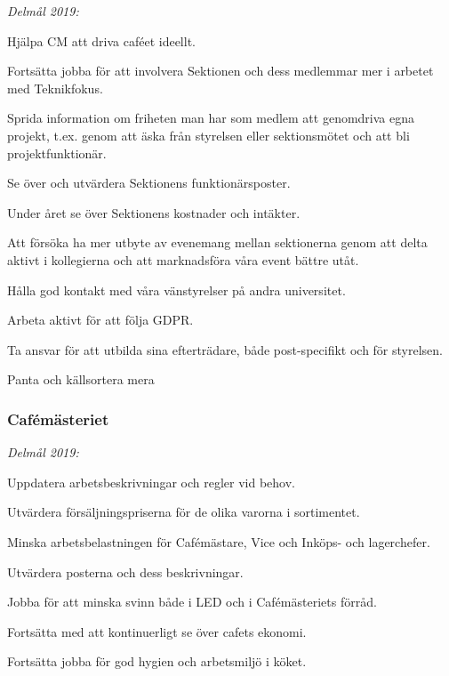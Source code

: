 \documentclass[10pt]{article}
\begin{document}
    \emph{Delmål 2019:}
    \begin{dashlist}
        \item Hjälpa CM att driva caféet ideellt. 
        \item Fortsätta jobba för att involvera Sektionen och dess medlemmar mer i arbetet med Teknikfokus. 
        \item Sprida information om friheten man har som medlem att genomdriva egna projekt, t.ex. genom att äska från styrelsen eller sektionsmötet och att bli projektfunktionär. 
        \item Se över och utvärdera Sektionens funktionärsposter. 
        \item Under året se över Sektionens kostnader och intäkter. 
        \item Att försöka ha mer utbyte av evenemang mellan sektionerna genom att delta aktivt i kollegierna och att marknadsföra våra event bättre utåt. 
        \item Hålla god kontakt med våra vänstyrelser på andra universitet.
        \item Arbeta aktivt för att följa GDPR.
        \item Ta ansvar för att utbilda sina efterträdare, både post-specifikt och för styrelsen.
        \item Panta och källsortera mera \scalebox{0.5}{\recycle}
    \end{dashlist}
    
    \subsubsection*{Cafémästeriet}
    
    \emph{Delmål 2019:}
    \begin{dashlist}
        \item Uppdatera arbetsbeskrivningar och regler vid behov. 
        \item Utvärdera försäljningspriserna för de olika varorna i sortimentet. 
        \item Minska arbetsbelastningen för Cafémästare, Vice och Inköps- och lagerchefer. 
        \item Utvärdera posterna och dess beskrivningar. 
        \item Jobba för att minska svinn både i LED och i Cafémästeriets förråd.
        \item Fortsätta med att kontinuerligt se över cafets ekonomi.
        \item Fortsätta jobba för god hygien och arbetsmiljö i köket.   
    \end{dashlist}
    
\end{document}

